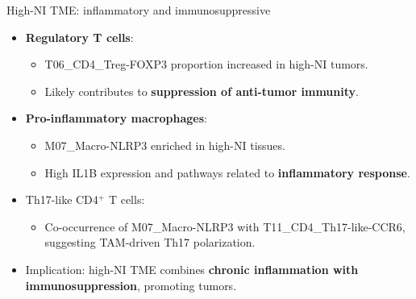 \documentclass[10pt]{beamer}
\theoremstyle{plain}
\begin{document}
\begin{frame}{High-NI TME: inflammatory and immunosuppressive}
  \begin{itemize}
    \item \textbf{Regulatory T cells}:
      \begin{itemize}
        \item T06\_CD4\_Treg-FOXP3 proportion increased in high-NI tumors.
        \item Likely contributes to \textbf{suppression of anti-tumor immunity}.
      \end{itemize}
    \item \textbf{Pro-inflammatory macrophages}:
      \begin{itemize}
        \item M07\_Macro-NLRP3 enriched in high-NI tissues.
        \item High IL1B expression and pathways related to \textbf{inflammatory response}.
      \end{itemize}
    \item Th17-like CD4\(^{+}\) T cells:
      \begin{itemize}
        \item Co-occurrence of M07\_Macro-NLRP3 with T11\_CD4\_Th17-like-CCR6, suggesting TAM-driven Th17 polarization.
      \end{itemize}
    \item Implication: high-NI TME combines \textbf{chronic inflammation with immunosuppression}, promoting tumors.
  \end{itemize}
\end{frame}
\end{document}
